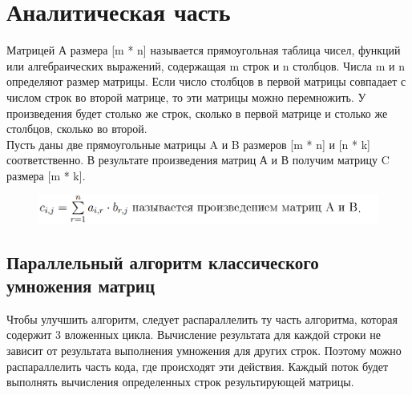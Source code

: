 \documentclass[a4paper, 12pt]{article}
\begin{document}
\section{Аналитическая часть}
\begin{flushleft}
	\hspace*{5mm} Матрицей А размера [m * n] называется прямоугольная таблица чисел, функций или алгебраических выражений, содержащая m строк и n столбцов. Числа m и n определяют размер матрицы. Если число столбцов в первой матрицы совпадает с числом строк во второй матрице, то эти матрицы можно перемножить. У произведения будет столько же строк, сколько в первой матрице и столько же столбцов, сколько во второй.
	\\ \hspace*{5mm} Пусть даны две прямоугольные матрицы A и B размеров [m * n] и [n * k] соответственно. В результате произведения матриц А и В получим матрицу C размера [m * k].\cite{mul}
	\begin{figure}[h]
		\hspace{5mm}
		\includegraphics[scale=0.8]{formula1}
	\end{figure} 
	\subsection{Параллельный алгоритм классического умножения матриц}
	\hspace*{5mm} Чтобы улучшить алгоритм, следует распараллелить ту часть алгоритма, которая содержит 3 вложенных цикла. Вычисление результата для каждой строки не зависит от результата выполнения умножения для других строк. Поэтому можно распараллелить часть кода, где происходят эти действия. Каждый поток будет выполнять вычисления определенных строк результирующей матрицы.

\end{flushleft}
\end{document}
